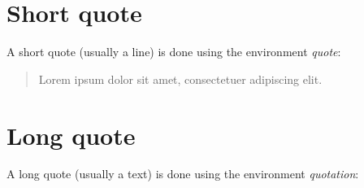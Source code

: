 \documentclass{article}
\begin{document}
\section*{Short quote}

A short quote (usually a line) is done using the environment \emph{quote}:

\begin{quote}
Lorem ipsum dolor sit amet, consectetuer adipiscing elit.
\end{quote}

\section*{Long quote}

A long quote (usually a text) is done using the environment \emph{quotation}:

\begin{quotation}
\lipsum
\end{quotation}
	
\end{document}
